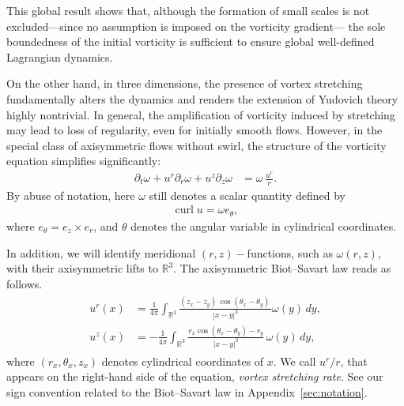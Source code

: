 \documentclass[reqno,11pt]{amsart}
\begin{document}
This global result shows that, although the formation of small scales is not excluded---since no assumption is imposed on the vorticity gradient--- the sole boundedness of the initial vorticity is sufficient to ensure global well-defined Lagrangian dynamics.

On the other hand, in three dimensions, the presence of vortex stretching fundamentally alters the dynamics and renders the extension of Yudovich theory highly nontrivial. In general, the amplification of vorticity induced by stretching may lead to loss of regularity, even for initially smooth flows. However, in the special class of axisymmetric flows without swirl, the structure of the vorticity equation simplifies significantly:
    \begin{align}
    \label{vor_eq}
        \partial_t \omega
        +u^r \partial_r \omega
        + u^z \partial _z \omega
        &= \omega \, \frac{u^r}{r}.
    \end{align}
By abuse of notation, here $\omega$ still denotes a scalar quantity defined by
    \begin{align*}
        \operatorname{curl} u= \omega e_\theta, 
    \end{align*}
where $e_\theta= e_z\times e_r$, and
$\theta$ denotes the angular variable in cylindrical coordinates. 

In addition, we will identify 
meridional $(r,z)-$functions, such as $\omega(r,z)$, with their axisymmetric lifts to $\mathbb{R}^3$. 
The axisymmetric Biot--Savart law reads as follows.
    \begin{align}
    \begin{aligned}
    \label{eq:axis_BS_law}
        u^r (x)
    &=
        \frac{1}{4\pi} \int_{\mathbb{R}^3}
            \frac{ (z_x-z_y)\, \cos (\theta_x-\theta_y ) \,  }{|x-y|^3}
            \omega(y) \, dy,
     \\
     u^z(x)
     &=-\frac{1}{4\pi}
     \int_{\mathbb{R}^3} 
     \frac{r_x \cos (\theta_x-\theta_y) -r_y}{|x-y|^3} \, \omega (y) \, dy,
     \end{aligned}
    \end{align}
where $(r_x,\theta_x,z_x)$ denotes cylindrical coordinates of $x$.
We  call $u^r/r$, that appears on the right-hand side of the equation, \emph{vortex stretching rate}. See our sign convention related to the Biot--Savart law in Appendix~\ref{sec:notation}.
\end{document}
